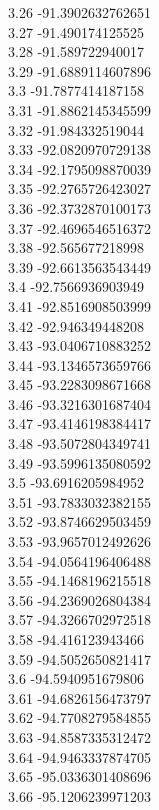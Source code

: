 {3.26	-91.3902632762651\\
3.27	-91.490174125525\\
3.28	-91.589722940017\\
3.29	-91.6889114607896\\
3.3	-91.7877414187158\\
3.31	-91.8862145345599\\
3.32	-91.984332519044\\
3.33	-92.0820970729138\\
3.34	-92.1795098870039\\
3.35	-92.2765726423027\\
3.36	-92.3732870100173\\
3.37	-92.4696546516372\\
3.38	-92.565677218998\\
3.39	-92.6613563543449\\
3.4	-92.7566936903949\\
3.41	-92.8516908503999\\
3.42	-92.946349448208\\
3.43	-93.0406710883252\\
3.44	-93.1346573659766\\
3.45	-93.2283098671668\\
3.46	-93.3216301687404\\
3.47	-93.4146198384417\\
3.48	-93.5072804349741\\
3.49	-93.5996135080592\\
3.5	-93.6916205984952\\
3.51	-93.7833032382155\\
3.52	-93.8746629503459\\
3.53	-93.9657012492626\\
3.54	-94.0564196406488\\
3.55	-94.1468196215518\\
3.56	-94.2369026804384\\
3.57	-94.3266702972518\\
3.58	-94.416123943466\\
3.59	-94.5052650821417\\
3.6	-94.5940951679806\\
3.61	-94.6826156473797\\
3.62	-94.7708279584855\\
3.63	-94.8587335312472\\
3.64	-94.9463337874705\\
3.65	-95.0336301408696\\
3.66	-95.1206239971203\\
}
